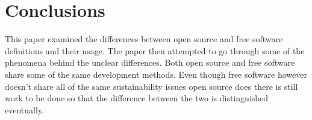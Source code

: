 \documentclass[conference]{IEEEtran}
\begin{document}
\section{Conclusions}
This paper examined the differences between open source and free software definitions and their usage. The paper then attempted to go through some of the phenomena behind the unclear differences. Both open source and free software share some of the same development methods. Even though free software however doesn't share all of the same sustainability issues open source does there is still work to be done so that the difference between the two is distinguished eventually.

{}
\end{document}
